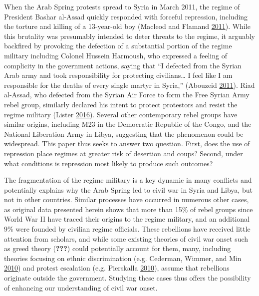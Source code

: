 \documentclass[12pt,]{article}
\begin{document}
When the Arab Spring protests spread to Syria in March 2011, the regime of President Bashar al-Assad quickly responded with forceful repression, including the torture and killing of a 13-year-old boy (Macleod and Flamand \protect\hyperlink{ref-Macleod2011}{2011}). While this brutality was presumably intended to deter threats to the regime, it arguably backfired by provoking the defection of a substantial portion of the regime military including Colonel Hussein Harmoush, who expressed a feeling of complicity in the government actions, saying that ``I defected from the Syrian Arab army and took responsibility for protecting civilians\ldots{} I feel like I am responsible for the deaths of every single martyr in Syria,'' (Abouzeid \protect\hyperlink{ref-Abouzeid2011}{2011}). Riad al-Assad, who defected from the Syrian Air Force to form the Free Syrian Army rebel group, similarly declared his intent to protect protestors and resist the regime military (Lister \protect\hyperlink{ref-Lister2016}{2016}). Several other contemporary rebel groups have similar origins, including M23 in the Democratic Republic of the Congo, and the National Liberation Army in Libya, suggesting that the phenomenon could be widespread. This paper thus seeks to answer two question. First, does the use of repression place regimes at greater risk of desertion and coups? Second, under what conditions is repression most likely to produce such outcomes?

The fragmentation of the regime military is a key dynamic in many conflicts and potentially explains why the Arab Spring led to civil war in Syria and Libya, but not in other countries. Similar processes have occurred in numerous other cases, as original data presented herein shows that more than 15\% of rebel groups since World War II have traced their origins to the regime military, and an additional 9\% were founded by civilian regime officials. These rebellions have received little attention from scholars, and while some existing theories of civil war onset such as greed theory ({\textbf{???}}) could potentially account for them, many, including theories focusing on ethnic discrimination (e.g. Cederman, Wimmer, and Min \protect\hyperlink{ref-Cederman2010}{2010}) and protest escalation (e.g. Pierskalla \protect\hyperlink{ref-Pierskalla2010}{2010}), assume that rebellions originate outside the government. Studying these cases thus offers the possibility of enhancing our understanding of civil war onset.
\end{document}
